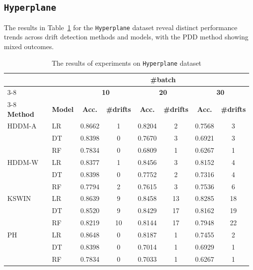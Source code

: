 \documentclass[pdflatex,sn-mathphys-ay]{sn-jnl}%
\theoremstyle{thmstyleone}%
\theoremstyle{thmstyletwo}%
\theoremstyle{thmstylethree}%
\begin{document}
\subsection*{\texttt{Hyperplane}}

The results in Table~\ref{tab:exp_Hyperplane} for the \texttt{Hyperplane} dataset reveal distinct performance trends across drift detection methods and models, with the PDD method showing mixed outcomes.

\begin{table}[h]
    \centering
    \scriptsize
    \caption{The results of experiments on \texttt{Hyperplane} dataset}
    \label{tab:exp_Hyperplane}
    \begin{tabular}{llcccccc}\toprule
       && \multicolumn{6}{c}{\textbf{\#batch}}\\\cmidrule(lr){3-8}
       && \multicolumn{2}{c}{\textbf{10}} & \multicolumn{2}{c}{\textbf{20}} & \multicolumn{2}{c}{\textbf{30}} \\\cmidrule(lr){3-8}
       \textbf{Method} & \textbf{Model} & \textbf{Acc.} & \textbf{\#drifts} & \textbf{Acc.} & \textbf{\#drifts} & \textbf{Acc.} & \textbf{\#drifts} \\\midrule
       HDDM-A & LR & 0.8662 & 1 & 0.8204 & 2 & 0.7568 & 3 \\
              & DT & 0.8398 & 0 & 0.7670 & 3 & 0.6921 & 3 \\
              & RF & 0.7834 & 0 & 0.6809 & 1 & 0.6267 & 1 \\\midrule
       HDDM-W & LR & 0.8377 & 1 & 0.8456 & 3 & 0.8152 & 4 \\
              & DT & 0.8398 & 0 & 0.7752 & 2 & 0.7316 & 4 \\
              & RF & 0.7794 & 2 & 0.7615 & 3 & 0.7536 & 6 \\\midrule
       KSWIN  & LR & 0.8639 & 9 & 0.8458 & 13 & 0.8285 & 18 \\
              & DT & 0.8520 & 9 & 0.8429 & 17 & 0.8162 & 19 \\
              & RF & 0.8219 & 10 & 0.8144 & 17 & 0.7948 & 22 \\\midrule
       PH & LR & 0.8648 & 0 & 0.8187 & 1 & 0.7455 & 2 \\
                   & DT & 0.8398 & 0 & 0.7014 & 1 & 0.6929 & 1 \\
                   & RF & 0.7834 & 0 & 0.7033 & 1 & 0.6267 & 1 \\\midrule

\end{tabular}
\end{table}
\end{document}

